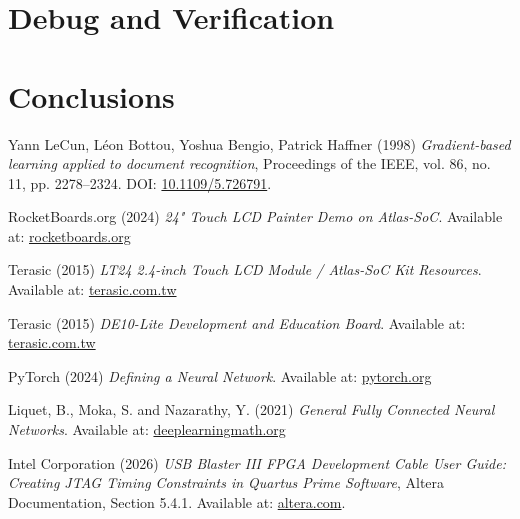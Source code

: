 \documentclass{article}
\begin{document}
    \newpage
    \section{Debug and Verification}
    
    
    \newpage
    \section{Conclusions}
    

    \newpage
    \begin{thebibliography}{}

    Yann LeCun, Léon Bottou, Yoshua Bengio, Patrick Haffner (1998) 
    \emph{Gradient-based learning applied to document recognition}, 
    Proceedings of the IEEE, vol. 86, no. 11, pp. 2278--2324. 
    DOI: \href{https://doi.org/10.1109/5.726791}{10.1109/5.726791}.

    RocketBoards.org (2024) 
    \emph{24" Touch LCD Painter Demo on Atlas-SoC}. 
    Available at: \href{https://www.rocketboards.org/foswiki/Projects/24TouchLCDPainterDemoOnAtlasSOC}
    {rocketboards.org} 

    Terasic (2015) 
    \emph{LT24 2.4-inch Touch LCD Module / Atlas-SoC Kit Resources}. 
    Available at: \href{https://www.terasic.com.tw/cgi-bin/page/archive.pl?Language=English&CategoryNo=65&No=892&PartNo=2}
    {terasic.com.tw} 

    Terasic (2015) 
    \emph{DE10-Lite Development and Education Board}. 
    Available at: \href{https://www.terasic.com.tw/cgi-bin/page/archive.pl?Language=English&CategoryNo=234&No=1021}
    {terasic.com.tw}

    PyTorch (2024) 
    \emph{Defining a Neural Network}. 
    Available at: \href{https://docs.pytorch.org/tutorials/recipes/recipes/defining_a_neural_network.html}
    {pytorch.org} 

    Liquet, B., Moka, S. and Nazarathy, Y. (2021) 
    \emph{General Fully Connected Neural Networks}. 
    Available at: \href{https://deeplearningmath.org/general-fully-connected-neural-networks}
    {deeplearningmath.org}

    Intel Corporation (2026) 
    \emph{USB Blaster III FPGA Development Cable User Guide: Creating JTAG Timing Constraints in Quartus Prime Software}, 
    Altera Documentation, Section 5.4.1. 
    Available at: \href{https://docs.altera.com/r/docs/864466/current/usb-blaster-iii-fpga-development-cable-user-guide/creating-jtag-timing-constraints-in-quartus-prime-software}{altera.com}.

\end{thebibliography}
		
\end{document}
